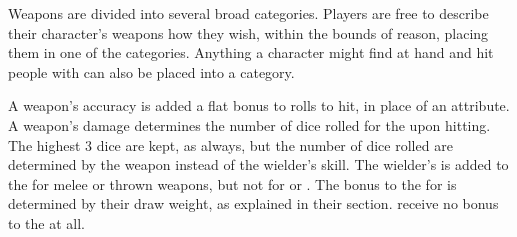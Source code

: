 Weapons are divided into several broad categories.
Players are free to describe their character's weapons how they wish, within the bounds of reason, placing them in one of the categories.
Anything a character might find at hand and hit people with can also be placed into a category.

A weapon's accuracy is added a flat bonus to rolls to hit, in place of an attribute.
A weapon's damage determines the number of dice rolled  for the {\damagetest} upon hitting.
The highest 3 dice are kept, as always, but the number of dice rolled are determined by the weapon instead of the wielder's skill.
The wielder's  is added to the {\damagetest} for melee or thrown weapons, but not for  or .
The bonus to the {\damagetest} for  is determined by their draw weight, as explained in their section.
 receive no bonus to the {\damagetest} at all.




